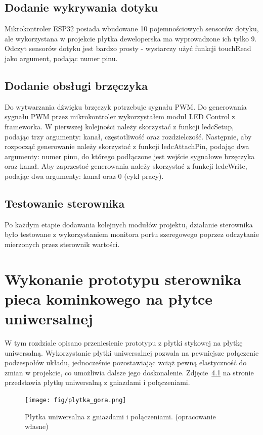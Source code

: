 \documentclass[11pt]{report}
\begin{document}
 \section{Dodanie wykrywania dotyku}
 Mikrokontroler ESP32 posiada wbudowane 10 pojemnościowych sensorów dotyku, ale wykorzystana w projekcie płytka deweloperska ma wyprowadzone ich tylko 9. Odczyt sensorów dotyku jest bardzo prosty - wystarczy użyć funkcji touchRead jako argument, podając numer pinu.
 
 \section{Dodanie obsługi brzęczyka}
 Do wytwarzania dźwięku brzęczyk potrzebuje sygnału PWM. Do generowania sygnału PWM przez mikrokontroler wykorzystałem moduł LED Control z frameworka. W pierwszej kolejności należy skorzystać z funkcji ledcSetup, podając trzy argumenty: kanał, częstotliwość oraz rozdzielczość. Następnie, aby rozpocząć generowanie należy skorzystać z funkcji ledcAttachPin, podając dwa argumenty: numer pinu, do którego podłączone jest wejście sygnałowe brzęczyka oraz kanał.
 Aby zaprzestać generowania należy skorzystać z funkcji ledcWrite, podając dwa argumenty: kanał oraz 0 (cykl pracy).
 
 \section{Testowanie sterownika}
 Po każdym etapie dodawania kolejnych modułów projektu, działanie sterownika było testowane z wykorzystaniem monitora portu szeregowego poprzez odczytanie mierzonych przez sterownik wartości.

 
 \chapter{Wykonanie prototypu sterownika pieca kominkowego na płytce uniwersalnej}\label{ch:prototyp:uniwersalna}
 W tym rozdziale opisano przeniesienie prototypu z płytki stykowej na płytkę uniwersalną.
 Wykorzystanie płytki uniwersalnej pozwala na pewniejsze połączenie podzespołów układu, jednocześnie pozostawiając wciąż pewną elastyczność do zmian w projekcie, co umożliwia dalsze jego doskonalenie.
 Zdjęcie~\ref{fig:uni_gora} na stronie~\pageref{fig:uni_gora} przedstawia płytkę uniwersalną z gniazdami i połączeniami.
\begin{figure}[ht]
\centering
\texttt{[image: fig/plytka\_gora.png]}
\caption{Płytka uniwersalna z gniazdami i połączeniami. (opracowanie własne)}
\label{fig:uni_gora}
\end{figure}
 
\end{document}
